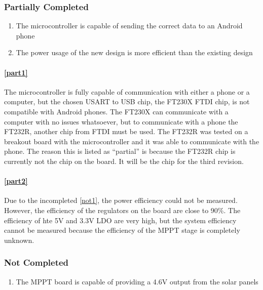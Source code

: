 \documentclass{article}
\numberwithin{figure}{section}
\numberwithin{equation}{section}
\begin{document}
{\subsubsection{Partially Completed}\label{vv-part-completed}
\begin{enumerate}[align=left,leftmargin=*,labelindent=0em,label=\textbf{Item \thesubsubsection.\arabic*.},itemindent=0em]
    \item \label{part1} The microcontroller is capable of sending the correct data to an Android phone
    \item \label{part2} The power usage of the new design is more efficient than the existing design
\end{enumerate}

\paragraph{\ref{part1}}
The microcontroller is fully capable of communication with either a phone or a computer, but the chosen USART to USB chip, the FT230X FTDI chip, is not compatible with Android phones. The FT230X can communicate with a computer with no issues whatsoever, but to communicate with a phone the FT232R, another chip from FTDI must be used. The FT232R was tested on a breakout board with the microcontroller and it was able to communicate with the phone. The reason this is listed as ``partial'' is because the FT232R chip is currently not the chip on the board. It will be the chip for the third revision.

\paragraph{\ref{part2}}
Due to the incompleted \ref{not1}, the power efficiency could not be measured. However, the efficiency of the regulators on the board are close to 90\%. The efficiency of hte 5V and 3.3V LDO are very high, but the system efficiency cannot be measured because the efficiency of the MPPT stage is completely unknown.

\subsubsection{Not Completed}\label{vv-not-completed}
\begin{enumerate}[align=left,leftmargin=*,labelindent=0em,label=\textbf{Item \thesubsubsection.\arabic*.},itemindent=0em]
    \item \label{not1} The MPPT board is capable of providing a 4.6V output from the solar panels
\end{enumerate}

}
\end{document}
